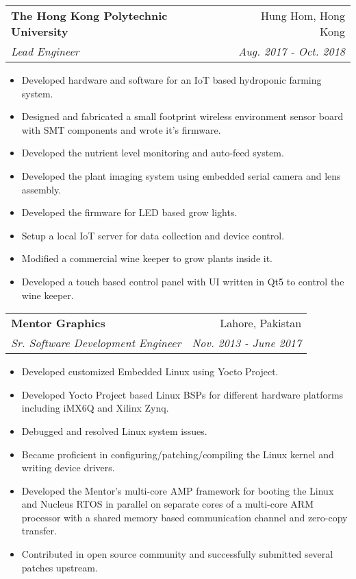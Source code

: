 \documentclass[a4paper,11pt]{article}
\makeatletter
\newcommand{\work}[4]{
    \begin{tabular*}{7.1in}{l@{\extracolsep{\fill}}r}
        \textbf{#1} & #2 \\
        \textit{#3} & \textit{#4} \\
    \end{tabular*}\vspace{-5pt}
}
\newcommand{\listitemone}{\item}
\newcommand{\listitemtwo}{\item[$\circ$]}
\makeatother
\begin{document}
\listitemone
    \work {The Hong Kong Polytechnic University}{Hung Hom, Hong Kong}
        {Lead Engineer}{Aug. 2017 - Oct. 2018}
	    \begin{itemize}[leftmargin=0.2in]
	        \listitemtwo
	            Developed hardware and software for an IoT based 
	            hydroponic farming system.
	        \listitemtwo
	            Designed and fabricated a small footprint wireless environment sensor board
	            with SMT components and wrote it's firmware.
	        \listitemtwo
	            Developed the nutrient level monitoring and auto-feed 
	            system.
	        \listitemtwo
	            Developed the plant imaging system using embedded serial
	            camera and lens assembly.
	        \listitemtwo
	            Developed the firmware for LED based grow lights.
	        \listitemtwo
	            Setup a local IoT server for data collection and 
	            device control.
	        \listitemtwo
	            Modified a commercial wine keeper to grow plants inside it.
	        \listitemtwo
	            Developed a touch based control panel with UI written 
	            in Qt5 to control the wine keeper.
	    \end{itemize}

\listitemone
    \work {Mentor Graphics}{Lahore, Pakistan}
        {Sr. Software Development Engineer}{Nov. 2013 - June 2017}
	    \begin{itemize}[leftmargin=0.2in]
	        \listitemtwo
	            Developed customized Embedded Linux using Yocto Project.
	        \listitemtwo
	            Developed Yocto Project based Linux BSPs for  
	            different hardware platforms including iMX6Q and 
	            Xilinx Zynq.
            \listitemtwo
                Debugged and resolved Linux system issues.
            \listitemtwo
                Became proficient in configuring/patching/compiling
                the Linux kernel and writing device drivers.
            \listitemtwo
                Developed the Mentor's multi-core AMP framework for
                booting the Linux and Nucleus RTOS in parallel on
                separate cores of a multi-core ARM processor with a
                shared memory based communication channel and 
                zero-copy transfer.
            \listitemtwo
                Contributed in open source community and successfully
                submitted several patches upstream.
	    \end{itemize}
	    
\end{document}
